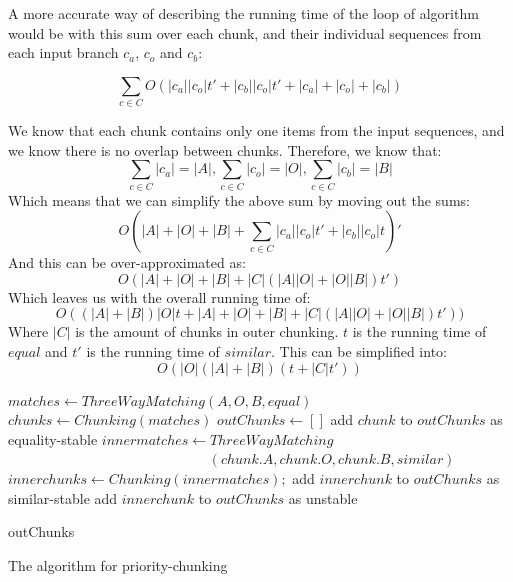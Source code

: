 \documentclass[11pt]{article}
\begin{document}
A more accurate way of describing the running time of the loop of algorithm would be with this sum over each chunk, and their individual sequences from each input branch $c_a$, $c_o$ and $c_b$:

\begin{equation}
\sum_{c \in C} O(|c_a||c_o|t' + |c_b||c_o|t' + |c_a|+|c_o|+|c_b|) \nonumber
\end{equation}

We know that each chunk contains only one items from the input sequences, and we know there is no overlap between chunks. Therefore, we know that:
\begin{equation}
\sum_{c \in C} |c_a| = |A| \nonumber
, \sum_{c \in C} |c_o| = |O| \nonumber
, \sum_{c \in C} |c_b| = |B| \nonumber
\end{equation}
Which means that we can simplify the above sum by moving out the sums:
\begin{equation}
O(|A| + |O| + |B| + \sum_{c \in C} |c_a||c_o|t' + |c_b||c_o|t)' \nonumber
\end{equation}
And this can be over-approximated as:
\begin{equation}
O(|A| + |O| + |B| + |C| (|A| |O| + |O| |B|) t') \nonumber
\end{equation}
Which leaves us with the overall running time of:
\begin{equation}
O((|A| + |B|)|O|t + |A|+|O|+|B| + |C| (|A| |O| + |O| |B|) t')) \nonumber
\end{equation}
Where $|C|$ is the amount of chunks in outer chunking. $t$ is the running time of $equal$ and $t'$ is the running time of $similar$. This can be simplified into:
\begin{equation}
O(|O| (|A| + |B|)(t + |C|t')) \nonumber
\end{equation}

\begin{algorithm}
\begin{algorithmic}
	\State $matches \gets ThreeWayMatching(A, O, B, equal)$
	\State $chunks \gets Chunking(matches)$
	\State $outChunks \gets []$
			\State add $chunk$ to $outChunks$ as equality-stable
		\Else
			\State $innermatches \gets ThreeWayMatching $
			\State ~~~~~~~~~~~~~~~~~~~~~~~~~~~~ $ (chunk.A, chunk.O, chunk.B, similar)$
            \State $innerchunks \gets Chunking(innermatches);$
					\State add $innerchunk$ to $outChunks$ as similar-stable
				\Else
					\State add $innerchunk$ to $outChunks$ as unstable
				\EndIf
			\EndFor
		\EndIf
	\EndFor


	\State \Return outChunks
\EndFunction
\end{algorithmic}
	\caption{The algorithm for priority-chunking}
	\label{PriorityChunk}
\end{algorithm}
\end{document}
